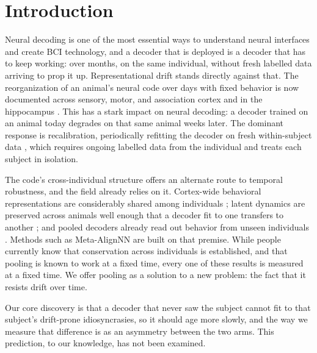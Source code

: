 \documentclass[mlmain,onecolumn]{jmlr}
\begin{document}
\section{Introduction}
Neural decoding is one of the most essential ways to understand neural interfaces and create BCI
technology, and a decoder that is deployed is a decoder that has to keep working: over months, on
the same individual, without fresh labelled data arriving to prop it up. Representational drift
stands directly against that. The reorganization of an animal's neural code over days with fixed
behavior is now documented across sensory, motor, and association cortex and in the hippocampus
\citep{rule2020,driscoll2017,schoonover2021}. This has a stark impact on neural decoding: a decoder
trained on an animal today degrades on that same animal weeks later. The dominant response is
recalibration, periodically refitting the decoder on fresh within-subject data
\citep{degenhart2020,jarosiewicz2015}, which requires ongoing labelled data from the individual and
treats each subject in isolation.

The code's cross-individual structure offers an alternate route to temporal robustness, and the
field already relies on it. Cortex-wide behavioral representations are considerably shared among
individuals \citep{musall2019,macdowell2020,macdowell2024}; latent dynamics are preserved across
animals well enough that a decoder fit to one transfers to another \citep{safaie2023}; and pooled
decoders already read out behavior from unseen individuals \citep{wicat2026,neds2025,peterson2021}.
Methods such as Meta-AlignNN \citep{metaalign2025} are built on that premise. While people currently
know that conservation across individuals is established, and that pooling is known to work at a
fixed time, every one of these results is measured at a fixed time. We offer pooling as a solution
to a new problem: the fact that it resists drift over time.

Our core discovery is that a decoder that never saw the subject cannot fit to that subject's
drift-prone idiosyncrasies, so it should age more slowly, and the way we measure that difference is
as an asymmetry between the two arms. This prediction, to our knowledge, has not been examined.
\end{document}
